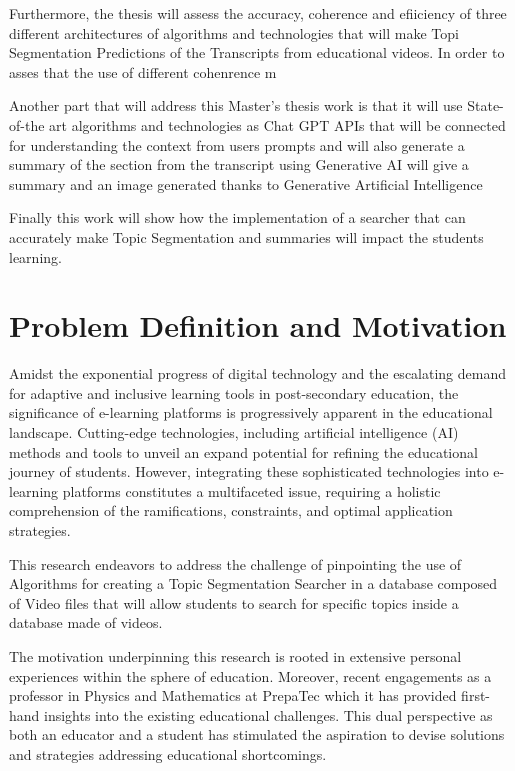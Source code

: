 Furthermore, the thesis will assess the accuracy, coherence and efiiciency of three different architectures of algorithms and technologies that will make Topi Segmentation Predictions of the Transcripts from educational videos.
In order to asses that the use of different cohenrence m

Another part that will address this Master's thesis work is that it will use State-of-the art algorithms and technologies as Chat GPT APIs that will be connected for understanding the context from  users prompts and will also generate a summary of the section from the transcript using Generative AI will give a summary and an image generated thanks to Generative Artificial Intelligence



Finally this work will show how the implementation of a searcher that can accurately make Topic Segmentation and summaries will impact the students learning. 


\label{chapter:chapter01}



\section{Problem Definition and Motivation}

Amidst the exponential progress of digital technology and the escalating demand for adaptive and inclusive learning tools in post-secondary education, the significance of e-learning platforms is progressively apparent in the educational landscape. Cutting-edge technologies, including artificial intelligence (AI) methods and tools to unveil an expand potential for refining the educational journey of students. However, integrating these sophisticated technologies into e-learning platforms constitutes a multifaceted issue, requiring a holistic comprehension of the ramifications, constraints, and optimal application strategies.

This research endeavors to address the challenge of pinpointing the use of Algorithms for creating a Topic Segmentation Searcher in a database composed of Video files that will allow students to search for specific topics inside a database made of videos. 

The motivation underpinning this research is rooted in extensive personal experiences within the sphere of education. Moreover, recent engagements as a professor in Physics and Mathematics at PrepaTec which it has provided first-hand insights into the existing educational challenges. This dual perspective as both an educator and a student has stimulated the aspiration to devise solutions and strategies addressing educational shortcomings.

